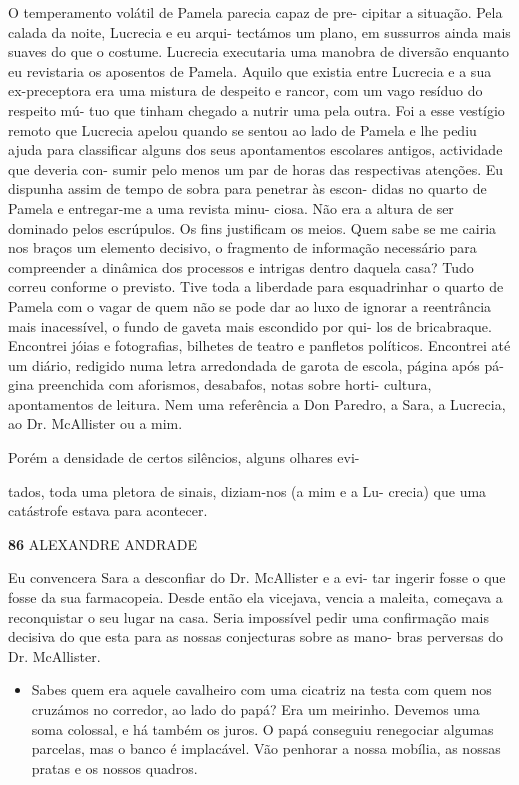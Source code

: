 O temperamento volátil de Pamela parecia capaz de pre- cipitar a
situação. Pela calada da noite, Lucrecia e eu arqui- tectámos um plano,
em sussurros ainda mais suaves do que o costume. Lucrecia executaria uma
manobra de diversão enquanto eu revistaria os aposentos de Pamela.
Aquilo que existia entre Lucrecia e a sua ex-preceptora era uma mistura
de despeito e rancor, com um vago resíduo do respeito mú- tuo que tinham
chegado a nutrir uma pela outra. Foi a esse vestígio remoto que Lucrecia
apelou quando se sentou ao lado de Pamela e lhe pediu ajuda para
classificar alguns dos seus apontamentos escolares antigos, actividade
que deveria con- sumir pelo menos um par de horas das respectivas
atenções. Eu dispunha assim de tempo de sobra para penetrar às escon-
didas no quarto de Pamela e entregar-me a uma revista minu- ciosa. Não
era a altura de ser dominado pelos escrúpulos. Os fins justificam os
meios. Quem sabe se me cairia nos braços um elemento decisivo, o
fragmento de informação necessário para compreender a dinâmica dos
processos e intrigas dentro daquela casa? Tudo correu conforme o
previsto. Tive toda a liberdade para esquadrinhar o quarto de Pamela com
o vagar de quem não se pode dar ao luxo de ignorar a reentrância mais
inacessível, o fundo de gaveta mais escondido por qui- los de
bricabraque. Encontrei jóias e fotografias, bilhetes de teatro e
panfletos políticos. Encontrei até um diário, redigido numa letra
arredondada de garota de escola, página após pá- gina preenchida com
aforismos, desabafos, notas sobre horti- cultura, apontamentos de
leitura. Nem uma referência a Don Paredro, a Sara, a Lucrecia, ao Dr.
McAllister ou a mim.

Porém a densidade de certos silêncios, alguns olhares evi-

tados, toda uma pletora de sinais, diziam-nos (a mim e a Lu- crecia) que
uma catástrofe estava para acontecer.

\textbf{86 }ALEXANDRE ANDRADE

Eu convencera Sara a desconfiar do Dr. McAllister e a evi- tar ingerir
fosse o que fosse da sua farmacopeia. Desde então ela vicejava, vencia a
maleita, começava a reconquistar o seu lugar na casa. Seria impossível
pedir uma confirmação mais decisiva do que esta para as nossas
conjecturas sobre as mano- bras perversas do Dr. McAllister.

\begin{itemize}
\tightlist
\item
  Sabes quem era aquele cavalheiro com uma cicatriz na testa com quem
  nos cruzámos no corredor, ao lado do papá? Era um meirinho. Devemos
  uma soma colossal, e há também os juros. O papá conseguiu renegociar
  algumas parcelas, mas o banco é implacável. Vão penhorar a nossa
  mobília, as nossas pratas e os nossos quadros.
\end{itemize}


